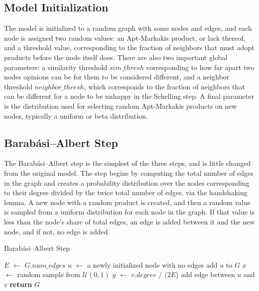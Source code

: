 \documentclass[12pt,twoside]{report}
\begin{document}
\subsection{Model Initialization}
The model is initialized to a random graph with some nodes and edges, and each node is assigned two random values: an Apt-Markakis product, or lack thereof, and a threshold value, corresponding to the fraction of neighbors that must adopt products before the node itself does. There are also two important global parameters: a similarity threshold $sim\_thresh$ corresponding to how far apart two nodes opinions can be for them to be considered different, and a neighbor threshold $neighbor\_thresh$, which corresponds to the fraction of neighbors that can be different for a node to be unhappy in the Schelling step. A final parameter is the distribution used for selecting random Apt-Markakis products on new nodes, typically a uniform or beta distribution. \\

\subsection{Barabási–Albert Step}

The Barabási–Albert step is the simplest of the three steps, and is little changed from the original model. The step begins by computing the total number of edges in the graph and creates a probability distribution over the nodes corresponding to their degree divided by the twice total number of edges, via the handshaking lemma. A new node with a random product is created, and then a random value is sampled from a uniform distribution for each node in the graph. If that value is less than the node's share of total edges, an edge is added between it and the new node, and if not, no edge is added. \\

\begin{algorithm}
\caption{Barabási–Albert Step}
\begin{algorithmic}
\State $E$ $\gets$ $G.num\_edges$ 
\State $u$ $\gets$ a newly initialized node with no edges
\State add $u$ to $G$
\State $x$ $\gets$ random sample from $\mathcal{U}(0,1)$
\State $y$ $\gets$ $v.degree$ / ($2E$)
\State add edge between $u$ and $v$
\EndIf
\EndFor
\State \textbf{return} $G$
\EndFunction
\end{algorithmic}
\end{algorithm}
\end{document}
